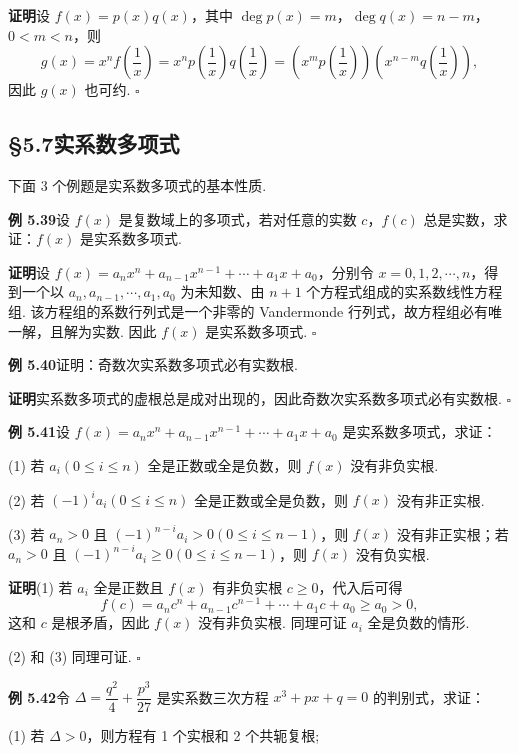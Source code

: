 \documentclass[UTF8, 12pt, fontset=fandol, oneside]{ctexart}
\begin{document}
\noindent\textbf{证明}\quad 设 $f(x)=p(x)q(x)$，其中 $\deg p(x)=m$，$\deg q(x)=n-m$，$0<m<n$，则
\[
g(x)=x^nf\left(\frac1x\right)
=x^np\left(\frac1x\right)q\left(\frac1x\right)
=\left(x^mp\left(\frac1x\right)\right)\left(x^{n-m}q\left(\frac1x\right)\right),
\]
因此 $g(x)$ 也可约. \hfill $\square$

\subsection*{§5.7\quad 实系数多项式}

下面 3 个例题是实系数多项式的基本性质.

\noindent\textbf{例 5.39}\quad 设 $f(x)$ 是复数域上的多项式，若对任意的实数 $c$，$f(c)$ 总是实数，求证：$f(x)$ 是实系数多项式.

\noindent\textbf{证明}\quad 设 $f(x)=a_nx^n+a_{n-1}x^{n-1}+\cdots+a_1x+a_0$，分别令 $x=0,1,2,\cdots,n$，得到一个以 $a_n,a_{n-1},\cdots,a_1,a_0$ 为未知数、由 $n+1$ 个方程式组成的实系数线性方程组. 该方程组的系数行列式是一个非零的 Vandermonde 行列式，故方程组必有唯一解，且解为实数. 因此 $f(x)$ 是实系数多项式. \hfill $\square$

\noindent\textbf{例 5.40}\quad 证明：奇数次实系数多项式必有实数根.

\noindent\textbf{证明}\quad 实系数多项式的虚根总是成对出现的，因此奇数次实系数多项式必有实数根. \hfill $\square$

\noindent\textbf{例 5.41}\quad 设 $f(x)=a_nx^n+a_{n-1}x^{n-1}+\cdots+a_1x+a_0$ 是实系数多项式，求证：

(1) 若 $a_i(0\le i\le n)$ 全是正数或全是负数，则 $f(x)$ 没有非负实根.

(2) 若 $(-1)^ia_i(0\le i\le n)$ 全是正数或全是负数，则 $f(x)$ 没有非正实根.

(3) 若 $a_n>0$ 且 $(-1)^{n-i}a_i>0(0\le i\le n-1)$，则 $f(x)$ 没有非正实根；若 $a_n>0$ 且 $(-1)^{n-i}a_i\ge0(0\le i\le n-1)$，则 $f(x)$ 没有负实根.

\noindent\textbf{证明}\quad (1) 若 $a_i$ 全是正数且 $f(x)$ 有非负实根 $c\ge0$，代入后可得
\[
f(c)=a_nc^n+a_{n-1}c^{n-1}+\cdots+a_1c+a_0\ge a_0>0,
\]
这和 $c$ 是根矛盾，因此 $f(x)$ 没有非负实根. 同理可证 $a_i$ 全是负数的情形.

(2) 和 (3) 同理可证. \hfill $\square$

\noindent\textbf{例 5.42}\quad 令 $\Delta=\dfrac{q^2}{4}+\dfrac{p^3}{27}$ 是实系数三次方程 $x^3+px+q=0$ 的判别式，求证：

(1) 若 $\Delta>0$，则方程有 1 个实根和 2 个共轭复根;
\end{document}
